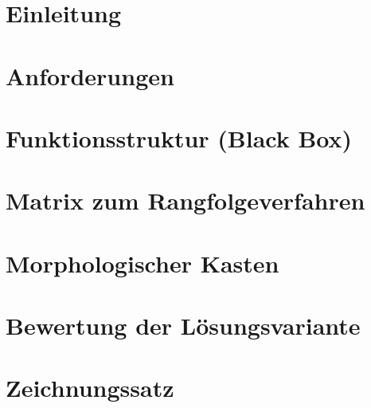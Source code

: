 \documentclass[a4paper,12pt]{article}
\begin{document}


\newpage

\tableofcontents
\vspace{1.5cm}

\newpage


\section{Einleitung}


\newpage

\section{Anforderungen}
\label{Anforderungen}


\newpage

\section{Funktionsstruktur (Black Box)}
\label{Funktionsstruktur}


\newpage

\section{Matrix zum Rangfolgeverfahren}
\label{Rangfolgeverfahren}


\newpage




\newpage

\section{Morphologischer Kasten}
\label{Morphologischer Kasten}


\newpage

\section{Bewertung der Lösungsvariante}
\label{Bewertung Lösungsvariante}


\newpage

\section{Zeichnungssatz}
\label{Zeichnungssatz}

\end{document}
